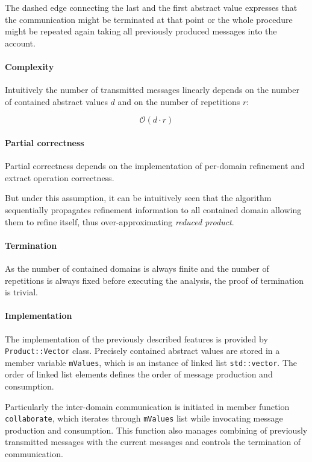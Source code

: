 \documentclass[12pt,oneside]{fithesis2}
\theoremstyle{definition}
\begin{document}
The dashed edge connecting the last and the first abstract value expresses that the communication might be terminated at that point or the whole procedure might be repeated again taking all previously produced messages into the account.

\paragraph{Complexity} Intuitively the number of transmitted messages linearly depends on the number of contained abstract values $d$ and on the number of repetitions $r$:

\[
\mathcal O(d \cdot r)
\]

\paragraph{Partial correctness}
Partial correctness depends on the implementation of per-domain refinement and extract operation correctness.

But under this assumption, it can be intuitively seen that the algorithm sequentially propagates refinement information to all contained domain allowing them to refine itself, thus over-approximating \textit{reduced product}.

\paragraph{Termination}
As the number of contained domains is always finite and the number of repetitions is always fixed before executing the analysis, the proof of termination is trivial.

\paragraph{Implementation} The implementation of the previously described features is provided by \texttt{Product::Vector} class. Precisely contained abstract values are stored in a member variable \texttt{mValues}, which is an instance of  linked list \texttt{std::vector}. The order of linked list elements defines the order of message production and consumption.

Particularly the inter-domain communication is initiated in member function \texttt{collaborate}, which iterates through \texttt{mValues} list while invocating message production and consumption. This function also manages combining of previously transmitted messages with the current messages and controls the termination of communication.
\end{document}

